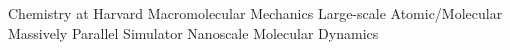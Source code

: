\begin{acronym}[CHARMM] %
  {Chemistry at Harvard Macromolecular Mechanics}
  {Large-scale Atomic/Molecular Massively Parallel Simulator}
    {Nanoscale Molecular Dynamics}
\end{acronym} 
